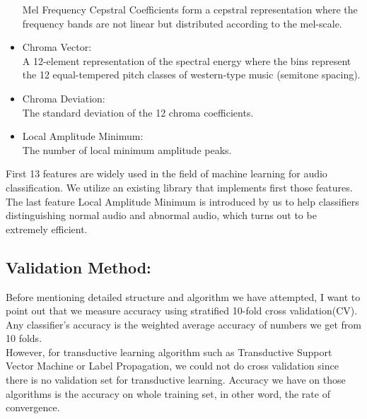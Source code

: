\begin{itemize}
	Mel Frequency Cepstral Coefficients form a cepstral representation where the frequency bands are not linear but distributed according to the mel-scale.\cite{b4}\\
	\item Chroma Vector:\\
	A 12-element representation of the spectral energy where the bins represent the 12 equal-tempered pitch classes of western-type music (semitone spacing).\cite{b5}\\
	\item Chroma Deviation:\\
	The standard deviation of the 12 chroma coefficients.\cite{b5}\\
	\item Local Amplitude Minimum:\\
	The number of local minimum amplitude peaks.\\
\end{itemize}
First 13 features are widely used in the field of machine learning for audio classification. We utilize an existing library\cite{b6} that implements first those features. The last feature Local Amplitude Minimum is introduced by us to help classifiers distinguishing normal audio and abnormal audio, which turns out to be extremely efficient. \\
\subsection{Validation Method:}
Before mentioning detailed structure and algorithm we have attempted, I want to point out that we measure accuracy using stratified 10-fold cross validation(CV). Any classifier's accuracy is the weighted average accuracy of numbers we get from 10 folds.  \\
\indent However, for transductive learning algorithm such as Transductive Support Vector Machine or Label Propagation, we could not do cross validation since there is no validation set for transductive learning. Accuracy we have on those algorithms is the accuracy on whole training set, in other word, the rate of convergence. 
